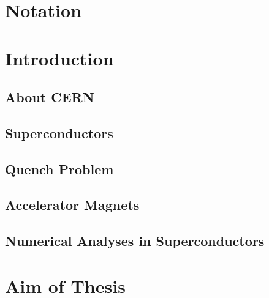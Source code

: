 \documentclass{article}
\begin{document}


\clearpage\thispagestyle{empty}
\tableofcontents
\clearpage\thispagestyle{empty}

\section*{Notation}
\label{section: notation}
% 
\newpage

\pagestyle{fancy}

\section{Introduction}

\subsection{About CERN}
\label{subsection: about cern}
% 

\subsection{Superconductors}
\label{subsection: superconductors}
% 

\subsection{Quench Problem}
\label{subsection: quench_problem}
% 

\subsection{Accelerator Magnets}
\label{subsection: accelerator_magnets}
% 

\subsection{Numerical Analyses in Superconductors}
\label{subsection: numerical_analyses_in_superconductors}
% 

\clearpage \thispagestyle{empty}
\section{Aim of Thesis}
\end{document}
